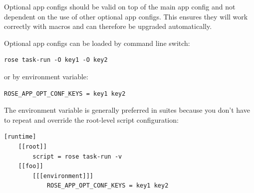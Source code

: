 Optional app configs should be valid on top of the main app config and not
dependent on the use of other optional app configs. This ensures they will
work correctly with macros and can therefore be upgraded automatically.


Optional app configs can be loaded by command line switch:

\begin{lstlisting}
rose task-run -O key1 -O key2
\end{lstlisting}

or by environment variable:

\begin{lstlisting}
ROSE_APP_OPT_CONF_KEYS = key1 key2
\end{lstlisting}

The environment variable is generally preferred in suites because you don't
have to repeat and override the root-level script configuration: 

\begin{lstlisting}
[runtime]
    [[root]]
        script = rose task-run -v
    [[foo]]
        [[[environment]]]
            ROSE_APP_OPT_CONF_KEYS = key1 key2
\end{lstlisting}
